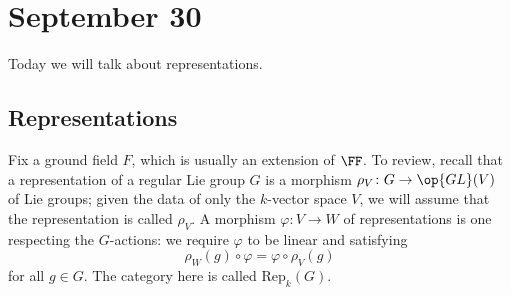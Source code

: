 \documentclass[../notes.tex]{subfiles}
\begin{document}
\section{September 30}
Today we will talk about representations.

\subsection{Representations}
Fix a ground field $F$, which is usually an extension of $\FF$. To review, recall that a representation of a regular Lie group $G$ is a morphism $\rho_V\colon G\to\op{GL}(V)$ of Lie groups; given the data of only the $k$-vector space $V$, we will assume that the representation is called $\rho_V$. A morphism $\varphi\colon V\to W$ of representations is one respecting the $G$-actions: we require $\varphi$ to be linear and satisfying
\[\rho_W(g)\circ\varphi=\varphi\circ\rho_V(g)\]
for all $g\in G$. The category here is called $\mathrm{Rep}_k(G)$.
\end{document}
